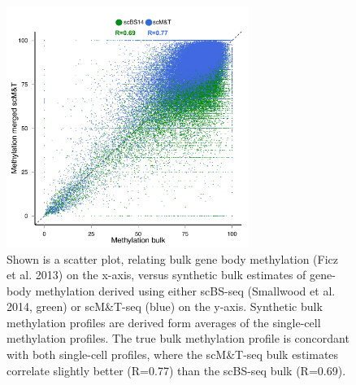 \begin{figure}[htbp!]
\centering
\includegraphics[width=0.7\textwidth]{bulk}
\caption[Correlation between single-cell methylomes and the methylome of a bulk cell population.]{Shown is a scatter plot, relating bulk gene body methylation (Ficz et al. 2013) on the x-axis, versus synthetic bulk estimates of gene- body methylation derived using either scBS-seq (Smallwood et al. 2014, green) or scM\&T-seq (blue) on the y-axis. Synthetic bulk methylation profiles are derived form averages of the single-cell methylation profiles. The true bulk methylation profile is concordant with both single-cell profiles, where the scM\&T-seq bulk estimates correlate slightly better (R=0.77) than the scBS-seq bulk (R=0.69).}
\label{fig:mt_bulk}
\end{figure}


